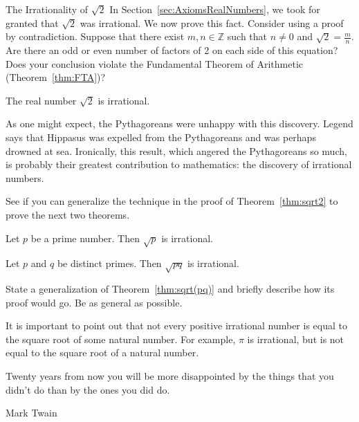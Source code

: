 \begin{section}{The Irrationality of $\sqrt{2}$}
In Section~\ref{sec:AxiomsRealNumbers}, we took for granted that $\sqrt{2}$ was irrational.  We now prove this fact. Consider using a proof by contradiction. Suppose that there exist $m,n\in\mathbb{Z}$ such that $n\ne 0$ and $\sqrt{2}=\frac{m}{n}$. Are there an odd or even number of factors of 2 on each side of this equation? Does your conclusion violate the Fundamental Theorem of Arithmetic (Theorem~\ref{thm:FTA})?

\begin{theorem}\label{thm:sqrt2}
The real number $\sqrt{2}$ is irrational.
\end{theorem}

As one might expect, the Pythagoreans were unhappy with this discovery. Legend says that Hippasus was expelled from the Pythagoreans and was perhaps drowned at sea. Ironically, this result, which angered the Pythagoreans so much, is probably their greatest contribution to mathematics: the discovery of irrational numbers.

See if you can generalize the technique in the proof of Theorem~\ref{thm:sqrt2} to prove the next two theorems.

\begin{theorem}\label{thm:sqrtp}
Let $p$ be a prime number.  Then $\sqrt{p}$ is irrational.
\end{theorem}

\begin{theorem}\label{thm:sqrt(pq)}
Let $p$ and $q$ be distinct primes.  Then $\sqrt{pq}$ is irrational.
\end{theorem}

\begin{problem}
State a generalization of Theorem~\ref{thm:sqrt(pq)} and briefly describe how its proof would go.  Be as general as possible.
\end{problem}

It is important to point out that not every positive irrational number is equal to the square root of some natural number.  For example, $\pi$ is irrational, but is not equal to the square root of a natural number.

\epigraph{Twenty years from now you will be more disappointed by the things that you didn't do than by the ones you did do.}{Mark Twain}

\end{section}
